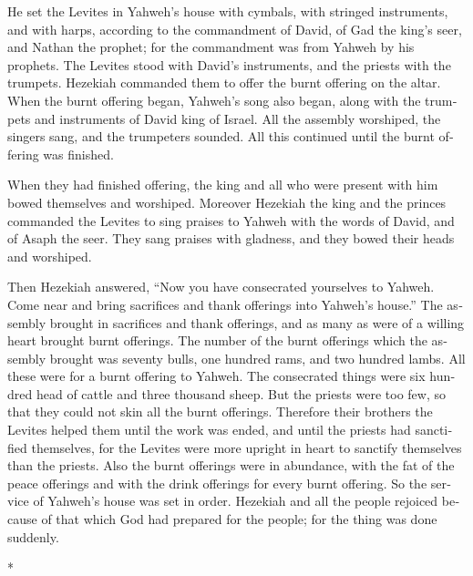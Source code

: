 \begin{paracol}{2}
\begin{otherlanguage}{english}
 He set the Levites in Yahweh's house with cymbals, with
stringed instruments, and with harps, according to the commandment of
David, of Gad the king's seer, and Nathan the prophet; for the
commandment was from Yahweh by his prophets.  The Levites
stood with David's instruments, and the priests with the trumpets.
 Hezekiah commanded them to offer the burnt offering on
the altar. When the burnt offering began, Yahweh's song also began,
along with the trumpets and instruments of David king of Israel.
 All the assembly worshiped, the singers sang, and the
trumpeters sounded. All this continued until the burnt offering was
finished.

 When they had finished offering, the king and all who
were present with him bowed themselves and worshiped. 
Moreover Hezekiah the king and the princes commanded the Levites to sing
praises to Yahweh with the words of David, and of Asaph the seer. They
sang praises with gladness, and they bowed their heads and worshiped.

 Then Hezekiah answered, ``Now you have consecrated
yourselves to Yahweh. Come near and bring sacrifices and thank offerings
into Yahweh's house.'' The assembly brought in sacrifices and thank
offerings, and as many as were of a willing heart brought burnt
offerings.  The number of the burnt offerings which the
assembly brought was seventy bulls, one hundred rams, and two hundred
lambs. All these were for a burnt offering to Yahweh. 
The consecrated things were six hundred head of cattle and three
thousand sheep.  But the priests were too few, so that
they could not skin all the burnt offerings. Therefore their brothers
the Levites helped them until the work was ended, and until the priests
had sanctified themselves, for the Levites were more upright in heart to
sanctify themselves than the priests.  Also the burnt
offerings were in abundance, with the fat of the peace offerings and
with the drink offerings for every burnt offering. So the service of
Yahweh's house was set in order.  Hezekiah and all the
people rejoiced because of that which God had prepared for the people;
for the thing was done suddenly.

\end{otherlanguage}

\switchcolumn[0]*

\hypertarget{celebraciuxf3n-de-la-pascua-de-ezechuxeeas}{%
}
\end{paracol}
